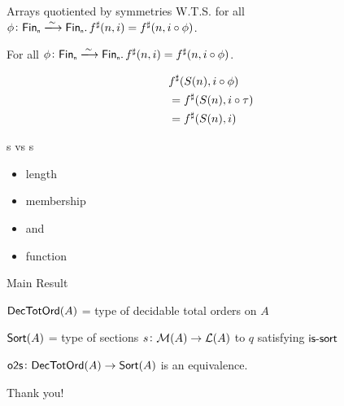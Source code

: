 \documentclass[9pt]{beamer}
\begin{document}
\begin{frame}[fragile]{Arrays quotiented by symmetries}
    W.T.S. for all $\phi\colon \Fin[n]\xto{\sim}\Fin[n]. \, \ext{f}(n, i) = \ext{f}(n, i \circ \phi)$.

    \begin{tblock}
    For all $\phi\colon \Fin[n]\xto{\sim}\Fin[n]. \, \ext{f}(n, i) = \ext{f}(n, i \circ \phi)$.
    
    \begin{align*}
        & {f}^{\sharp}(S(n), i \circ \phi) \\
        & = {f}^{\sharp}(S(n), i \circ \tau) \\
        & = {f}^{\sharp}(S(n), i)
    \end{align*}
    
    \end{tblock}
    
\end{frame}

\begin{frame}[fragile]{s vs s}
    \begin{itemize}
        \item length
        \item membership
        \item {} and 
        \item {} function
    \end{itemize}
\end{frame}


\begin{frame}{Main Result}

\begin{dblock}
    $\mathsf{DecTotOrd}(A)$ = type of decidable total orders on $A$

    $\mathsf{Sort}(A)$ = type of sections $s\colon \mathcal{M}(A) \to \mathcal{L}(A)$ to $q$ satisfying $\operatorname{\mathsf{is-sort}}$
\end{dblock}

\begin{tblock}
    $\operatorname{\mathsf{o2s}}\colon \mathsf{DecTotOrd}(A) \to \mathsf{Sort}(A)$ is an equivalence.
\end{tblock}

\end{frame}

\begin{frame}[standout]
    Thank you!
\end{frame}
\end{document}

